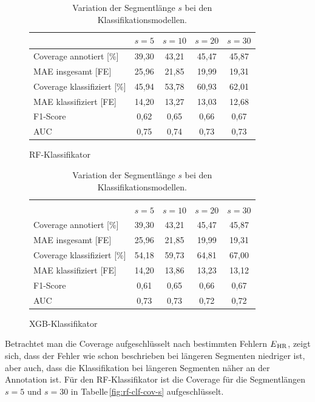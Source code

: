 \begin{table}[H]
	\begin{subfigure}{\textwidth}
	\centering
	\begin{tabular}{l || c | c | c | c }
								& $s = 5$	& $s=10$		& $s=20$		& $s=30$	\\ \hline
	Coverage annotiert [\%]		& 39,30		& 43,21	 	& 45,47		& 45,87\\
	\ac{MAE} insgesamt [FE]		& 25,96		& 21,85		& 19,99		& 19,31\\\hline
 	Coverage klassifiziert [\%]	& 45,94		& 53,78 		& 60,93		& 62,01\\
 	\ac{MAE} klassifiziert [FE]	& 14,20		& 13,27		& 13,03		& 12,68\\
 	F1-Score 					& 0,62		& 0,65		& 0,66		& 0,67\\
 	AUC 						& 0,75		& 0,74		& 0,73		& 0,73\\
 	\end{tabular}	
	\caption{\ac{RF}-Klassifikator}
	\end{subfigure}
	\begin{subfigure}{\textwidth}
	\centering
	\begin{tabular}{l || c | c | c | c }
	\multicolumn{5}{l}{	}	\\
								& $s = 5$	& $s=10$		& $s=20$		& $s=30$	\\ \hline
								
	Coverage annotiert [\%]		& 39,30		& 43,21	 	& 45,47		& 45,87\\
	\ac{MAE} insgesamt [FE]		& 25,96		& 21,85		& 19,99		& 19,31\\\hline
 	Coverage klassifiziert [\%]	& 54,18		& 59,73 		& 64,81		& 67,00\\
 	\ac{MAE} klassifiziert [FE]	& 14,20		& 13,86		& 13,23		& 13,12\\
 	F1-Score 					& 0,61		& 0,65		& 0,66		& 0,67\\
 	AUC 						& 0,73		& 0,73		& 0,72		& 0,72\\
 	\end{tabular}		
	\caption{\ac{XGB}-Klassifikator}
	\end{subfigure}
	\caption{Variation der Segmentlänge $s$ bei den Klassifikationsmodellen.}
	\label{fig:var-s-clf}
\end{table}

Betrachtet man die Coverage aufgeschlüsselt nach bestimmten Fehlern $E\textsubscript{HR}$, zeigt sich, dass der Fehler wie schon beschrieben bei längeren Segmenten niedriger ist, aber auch, dass die Klassifikation bei längeren Segmenten näher an der Annotation ist. Für den \ac{RF}-Klassifikator ist die Coverage für die Segmentlängen $s=5$ und $s=30$ in Tabelle\,\ref{fig:rf-clf-cov-s} aufgeschlüsselt.

